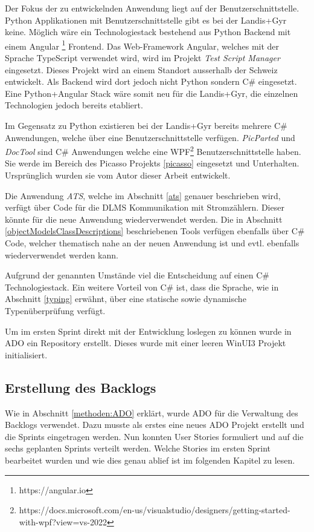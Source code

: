 Der Fokus der zu entwickelnden Anwendung liegt auf der Benutzerschnittstelle.
Python Applikationen mit Benutzerschnittstelle gibt es bei der Landis+Gyr keine.
Möglich wäre ein Technologiestack bestehend aus Python Backend mit einem Angular \footnote{https://angular.io} Frontend.
Das Web-Framework Angular, welches mit der Sprache TypeScript verwendet wird, wird im Projekt \textit{Test Script Manager} eingesetzt.
Dieses Projekt wird an einem Standort ausserhalb der Schweiz entwickelt.
Als Backend wird dort jedoch nicht Python sondern C\# eingesetzt.
Eine Python+Angular Stack wäre somit neu für die Landis+Gyr, die einzelnen Technologien jedoch bereits etabliert.

Im Gegensatz zu Python existieren bei der Landis+Gyr bereits mehrere C\# Anwendungen, welche über eine Benutzerschnittstelle verfügen.
\textit{PicParted} und \textit{DocTool} sind C\# Anwendungen welche eine \ac{WPF}\footnote{https://docs.microsoft.com/en-us/visualstudio/designers/getting-started-with-wpf?view=vs-2022} Benutzerschnittstelle haben.
Sie werde im Bereich des Picasso Projekts \ref{picasso} eingesetzt und Unterhalten. 
Ursprünglich wurden sie vom Autor dieser Arbeit entwickelt.

Die Anwendung \textit{ATS}, welche im Abschnitt \ref{ats} genauer beschrieben wird, verfügt über Code für die \ac{DLMS} Kommunikation mit Stromzählern.
Dieser könnte für die neue Anwendung wiederverwendet werden.
Die in Abschnitt \ref{objectModelsClassDescriptions} beschriebenen Tools verfügen ebenfalls über C\# Code, welcher thematisch nahe an der neuen Anwendung ist und evtl. ebenfalls wiederverwendet werden kann.

Aufgrund der genannten Umstände viel die Entscheidung auf einen C\# Technologiestack.
Ein weitere Vorteil von C\# ist, dass die Sprache, wie in Abschnitt \ref{typing} erwähnt, über eine statische sowie dynamische Typenüberprüfung verfügt.

Um im ersten Sprint direkt mit der Entwicklung loslegen zu können wurde in \ac{ADO} ein Repository erstellt.
Dieses wurde mit einer leeren WinUI3 Projekt initialisiert.




\subsection{Erstellung des Backlogs}
Wie in Abschnitt \ref{methoden:ADO} erklärt, wurde \ac{ADO} für die Verwaltung des Backlogs verwendet.
Dazu musste als erstes eine neues \ac{ADO} Projekt erstellt und die Sprints eingetragen werden.
Nun konnten User Stories formuliert und auf die sechs geplanten Sprints verteilt werden.
Welche Stories im ersten Sprint bearbeitet wurden und wie dies genau ablief ist im folgenden Kapitel zu lesen.
